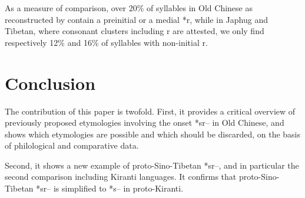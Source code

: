 \documentclass[oldfontcommands,oneside,a4paper,11pt]{article}
\newcommand{\ipa}[1]{{\phon #1}} %
\begin{document}
As a measure of comparison, over 20\% of syllables in Old Chinese as reconstructed by \citet{bs14oc} contain a preinitial or a medial *\ipa{r}, while in Japhug and Tibetan, where consonant clusters including \ipa{r} are attested, we only find respectively 12\% and 16\% of syllables with non-initial \ipa{r}. 

\section{Conclusion}

The contribution of this paper is twofold. First, it provides a critical overview of previously proposed etymologies involving the onset *\ipa{sr--} in Old Chinese, and shows which etymologies are possible and which should be discarded, on the basis of philological and comparative data.

Second, it shows a new example of proto-Sino-Tibetan *\ipa{sr--}, and in particular the second comparison including Kiranti languages. It confirms that proto-Sino-Tibetan *\ipa{sr--} is simplified to *\ipa{s--} in proto-Kiranti.
\end{document}

